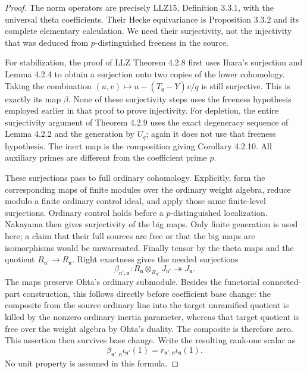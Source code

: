 \begin{proof}
The norm operators are precisely LLZ15, Definition 3.3.1,
with the universal theta coefficients.  Their Hecke equivariance
is Proposition 3.3.2 and its complete elementary calculation.
We need their surjectivity, not the injectivity that was deduced
from \(p\)-distinguished freeness in the source.

For stabilization, the proof of LLZ Theorem 4.2.8 first uses
Ihara's surjection and Lemma 4.2.4 to obtain a surjection onto
two copies of the lower cohomology.  Taking the combination
\((u,v)\mapsto u-(T_q-Y)v/q\) is still surjective.  This is
exactly its map \(\beta\).  None of these surjectivity steps
uses the freeness hypothesis employed earlier in that proof
to prove injectivity.  For depletion, the entire surjectivity
argument of Theorem 4.2.9 uses the exact degeneracy sequence
of Lemma 4.2.2 and the generation by \(U_q\); again it does
not use that freeness hypothesis.  The inert map is the
composition giving Corollary 4.2.10.  All auxiliary primes
are different from the coefficient prime \(p\).

These surjections pass to full ordinary cohomology.  Explicitly,
form the corresponding maps of finite modules over the ordinary
weight algebra, reduce modulo a finite ordinary control ideal,
and apply those same finite-level surjections.  Ordinary control
holds before a \(p\)-distinguished localization.  Nakayama then
gives surjectivity of the big maps.  Only finite generation is
used here; a claim that their full sources are free or that the
big maps are isomorphisms would be unwarranted.  Finally tensor
by the theta maps and the quotient
\(R_{\mathfrak n'}\to R_{\mathfrak n}\).  Right exactness gives
the needed surjections
\[
 \beta_{\mathfrak n',\mathfrak n}:
 R_{\mathfrak n}\otimes_{R_{\mathfrak n'}}J_{\mathfrak n'}
                      \twoheadrightarrow J_{\mathfrak n}.       \tag{CIR.12}
\]
The maps preserve Ohta's ordinary submodule.  Besides the
functorial connected-part construction, this follows directly
before coefficient base change: the composite from the source
ordinary line into the target unramified quotient is killed
by the nonzero ordinary inertia parameter, whereas that target
quotient is free over the weight algebra by Ohta's duality.
The composite is therefore zero.  This assertion then survives
base change.  Write the resulting rank-one scalar as
\[
 \beta_{\mathfrak n',\mathfrak n}\iota_{\mathfrak n'}(1)
                 =r_{\mathfrak n',\mathfrak n}
                         \iota_{\mathfrak n}(1).        \tag{CIR.13}
\]
No unit property is assumed in this formula.


\end{proof}
